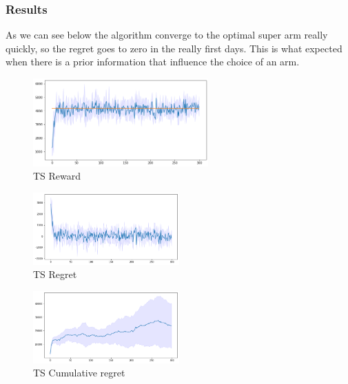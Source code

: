 \subsubsection{Results}
As we can see below the algorithm converge to the optimal super arm really quickly, so the regret goes to zero in the really first days. This is what expected when there is a prior information that influence the choice of an arm.
\begin{figure}[ht]
    \begin{center}
    \includegraphics[width=0.6\textwidth]{img/TS3.png}
    \caption{TS Reward}
    \label{fig:reward32}
    \end{center}
\end{figure}
\begin{multicols}{2}
    \begin{figure}[H]
        \begin{center}
        \includegraphics[width=0.5\textwidth]{img/TS3_regret.png}
        \caption{TS Regret}
        \label{fig:regret32}
        \end{center}
    \end{figure}
    \columnbreak
    \begin{figure}[H]
        \begin{center}
        \includegraphics[width=0.5\textwidth]{img/TS3_cum_reg.png}
        \caption{TS Cumulative regret}
        \label{fig:cum_reg32}
        \end{center}
    \end{figure}
\end{multicols}